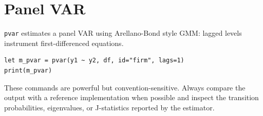 \section{Panel VAR}

\texttt{pvar} estimates a panel VAR using Arellano-Bond style GMM: lagged
levels instrument first-differenced equations.

\begin{lstlisting}[caption={Panel VAR}]
let m_pvar = pvar(y1 ~ y2, df, id="firm", lags=1)
print(m_pvar)
\end{lstlisting}

These commands are powerful but convention-sensitive. Always compare the
output with a reference implementation when possible and inspect the
transition probabilities, eigenvalues, or J-statistics reported by the
estimator.
